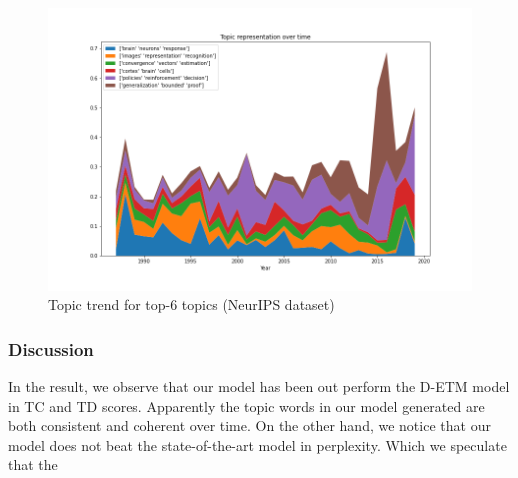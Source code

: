 \begin{figure}
\centering
\includegraphics[width=1\linewidth]{figures/1128/stack(2)}
\caption{Topic trend for top-6 topics (NeurIPS dataset)}
\label{fig:stack2}
\end{figure}
\subsubsection{Discussion}
In the result, we observe that our model has been out perform the D-ETM model in TC and TD scores. Apparently the topic words in our model generated are both consistent  and coherent over time.
On the other hand, we notice that our model does not beat the state-of-the-art model in perplexity. Which we speculate that the 